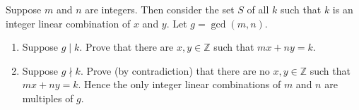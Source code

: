Suppose $m$ and $n$ are integers. Then consider the set $S$ of all $k$ such that $k$ is an integer linear combination of $x$ and $y$. Let $g = \gcd(m, n)$.
\begin{enumerate}
    \item Suppose $g \mid k$. Prove that there are $x, y \in \mathbb{Z}$ such that $mx + ny = k$.
    \item Suppose $g \nmid k$. Prove (by contradiction) that there are no $x, y \in \mathbb{Z}$ such that $mx + ny = k$. Hence the only integer linear combinations of $m$ and $n$ are multiples of $g$.
\end{enumerate}